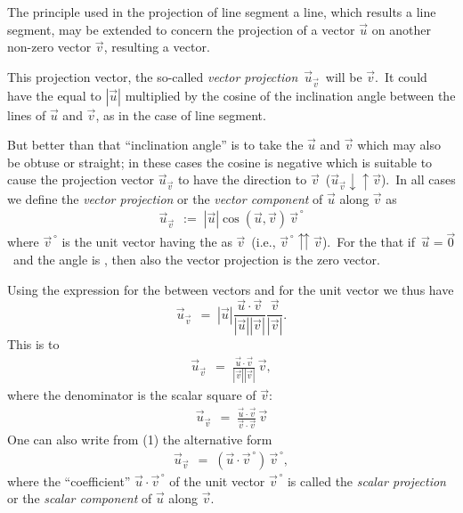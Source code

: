 \documentclass[12pt]{article}
\theoremstyle{definition}
\begin{document}
 

The principle used in the projection of line segment  a line, which results a line segment, may be extended to concern the projection of a vector $\vec{u}$ on another non-zero vector $\vec{v}$, resulting a vector.

This projection vector, the so-called \emph{vector projection}\, $\vec{u}_{\vec{v}}$\, will be  $\vec{v}$.\, It could have the  equal to $|\vec{u}|$ multiplied by the cosine of the inclination angle between the lines of $\vec{u}$ and $\vec{v}$, as in the case of line segment.

But better than that ``inclination angle'' is to take the  $\vec{u}$ and $\vec{v}$ which may also be obtuse or straight; in these cases the cosine is negative which is suitable to cause the projection vector $\vec{u}_{\vec{v}}$ to have the  direction to $\vec{v}$\, ($\vec{u}_{\vec{v}} \downarrow\!\uparrow \vec{v}$).\, In all cases we define the \emph{vector projection} or the \emph{vector component} of $\vec{u}$ along $\vec{v}$ as
\begin{align}   
\vec{u}_{\vec{v}} \,\;:=\; |\vec{u}|\cos(\vec{u},\vec{v})\,\vec{v}^{\,\circ}
\end{align}
where $\vec{v}^{\,\circ}$ is the unit vector having the  as $\vec{v}$\, 
(i.e., $\vec{v}^{\,\circ} \upuparrows \vec{v}$).\, For the  that if\, $\vec{u} = \vec{0}$\, and the angle is , then also the vector projection is the zero vector.

Using the expression for the  between vectors and for the unit vector we thus have
$$\vec{u}_{\vec{v}} \,\;=\; |\vec{u}|\frac{\vec{u}\cdot\vec{v}}{|\vec{u}||\vec{v}|}\frac{\vec{v}}{|\vec{v}|}.$$
This is  to
\begin{align}   
\vec{u}_{\vec{v}} \,\;=\; \frac{\vec{u}\cdot\vec{v}}{|\vec{v}||\vec{v}|}\,\vec{v},
\end{align}
where the denominator is the scalar square of $\vec{v}$:
\begin{align}   
\vec{u}_{\vec{v}} \,\;=\; \frac{\vec{u}\cdot\vec{v}}{\vec{v}\cdot\vec{v}}\,\vec{v}
\end{align}
One can also write from (1) the alternative form
\begin{align}   
\vec{u}_{\vec{v}} \,\;=\; (\vec{u}\cdot\vec{v}^{\,\circ})\,\vec{v}^{\,\circ},
\end{align}
where the ``coefficient'' $\vec{u}\cdot\vec{v}^{\,\circ}$ of the unit vector $\vec{v}^{\,\circ}$ is called the \emph{scalar projection} or the \emph{scalar component} of $\vec{u}$ along $\vec{v}$.\\
\end{document}
